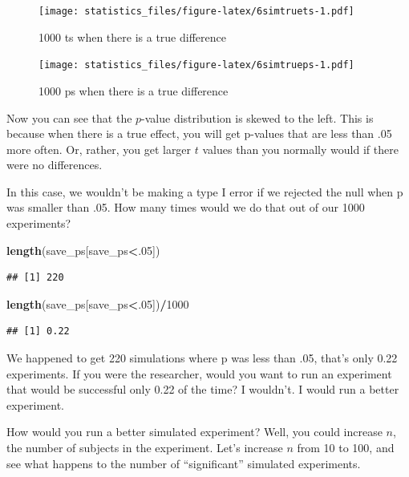 \documentclass[]{book}
\newenvironment{Shaded}{\begin{snugshade}}{\end{snugshade}}
\newcommand{\DecValTok}[1]{\textcolor[rgb]{0.00,0.00,0.81}{#1}}
\newcommand{\KeywordTok}[1]{\textcolor[rgb]{0.13,0.29,0.53}{\textbf{#1}}}
\newcommand{\NormalTok}[1]{#1}
\newcommand{\OperatorTok}[1]{\textcolor[rgb]{0.81,0.36,0.00}{\textbf{#1}}}
\begin{document}
\begin{figure}
\centering
\texttt{[image: statistics\_files/figure-latex/6simtruets-1.pdf]}
\caption{\label{fig:6simtruets}1000 ts when there is a true difference}
\end{figure}

\begin{figure}
\centering
\texttt{[image: statistics\_files/figure-latex/6simtrueps-1.pdf]}
\caption{\label{fig:6simtrueps}1000 ps when there is a true difference}
\end{figure}

Now you can see that the \(p\)-value distribution is skewed to the left. This is because when there is a true effect, you will get p-values that are less than .05 more often. Or, rather, you get larger \(t\) values than you normally would if there were no differences.

In this case, we wouldn't be making a type I error if we rejected the null when p was smaller than .05. How many times would we do that out of our 1000 experiments?

\begin{Shaded}
\begin{Highlighting}[]
\KeywordTok{length}\NormalTok{(save_ps[save_ps}\OperatorTok{<}\NormalTok{.}\DecValTok{05}\NormalTok{])}
\end{Highlighting}
\end{Shaded}

\begin{verbatim}
## [1] 220
\end{verbatim}

\begin{Shaded}
\begin{Highlighting}[]
\KeywordTok{length}\NormalTok{(save_ps[save_ps}\OperatorTok{<}\NormalTok{.}\DecValTok{05}\NormalTok{])}\OperatorTok{/}\DecValTok{1000}
\end{Highlighting}
\end{Shaded}

\begin{verbatim}
## [1] 0.22
\end{verbatim}

We happened to get 220 simulations where p was less than .05, that's only 0.22 experiments. If you were the researcher, would you want to run an experiment that would be successful only 0.22 of the time? I wouldn't. I would run a better experiment.

How would you run a better simulated experiment? Well, you could increase \(n\), the number of subjects in the experiment. Let's increase \(n\) from 10 to 100, and see what happens to the number of ``significant'' simulated experiments.
\end{document}
